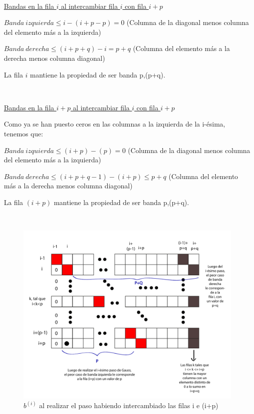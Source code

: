 ~

\underline{Bandas en la fila $i$ al intercambiar fila $i$ con fila $i+p$}

$Banda \ izquierda \leq i - (i+p-p) = 0$ (Columna de la diagonal menos columna del elemento más a la izquierda)

$Banda \ derecha \leq (i+p+q) - i = p+q$ (Columna del elemento más a la derecha menos columna diagonal)

La fila $i$ mantiene la propiedad de ser banda p,(p+q).

~

\underline{Bandas en la fila $i+p$ al intercambiar fila $i$ con fila $i+p$}

Como ya se han puesto ceros en las columnas a la izquierda de la i-ésima, tenemos que:

$Banda \ izquierda \leq (i+p) - (p) = 0$ (Columna de la diagonal menos columna del elemento más a la izquierda)

$Banda \ derecha \leq (i+p+q-1) - (i+p) \leq p+q$ (Columna del elemento más a la derecha menos columna diagonal)

La fila $(i+p)$ mantiene la propiedad de ser banda p,(p+q).

~

\begin{figure}[!h]
	\begin{center}
		  \includegraphics[scale=0.5]{Imagenes/im_10.pdf}
		  \caption{$b^{(i)}$ al realizar el paso habiendo intercambiado las filas i e (i+p)}
		  \label{fig:contra1}
	\end{center}
\end{figure}

